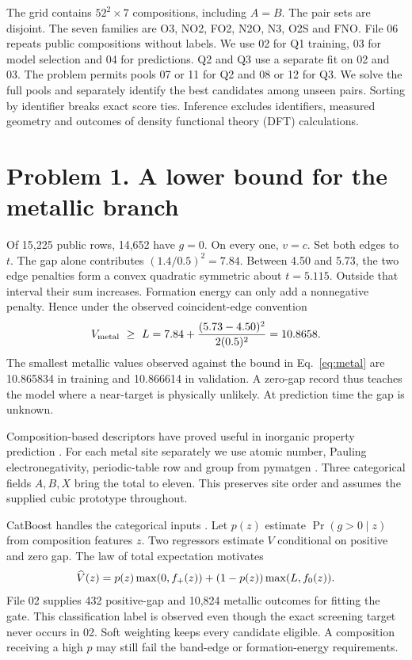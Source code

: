 The grid contains $52^2\times7$ compositions, including $A=B$. The pair sets are disjoint. The seven families are O3, NO2, FO2, N2O, N3, O2S and FNO. File 06 repeats public compositions without labels. We use 02 for Q1 training, 03 for model selection and 04 for predictions. Q2 and Q3 use a separate fit on 02 and 03. The problem permits pools 07 or 11 for Q2 and 08 or 12 for Q3. We solve the full pools and separately identify the best candidates among unseen pairs. Sorting by identifier breaks exact score ties. Inference excludes identifiers, measured geometry and outcomes of density functional theory (DFT) calculations.


\section{Problem 1. A lower bound for the metallic branch}
Of 15,225 public rows, 14,652 have $g=0$. On every one, $v=c$. Set both edges to $t$. The gap alone contributes $(1.4/0.5)^2=7.84$. Between 4.50 and 5.73, the two edge penalties form a convex quadratic symmetric about $t=5.115$. Outside that interval their sum increases. Formation energy can only add a nonnegative penalty. Hence under the observed coincident-edge convention
\begin{equation}
 V_{\rm metal}\ \geq\ L=7.84+
 \frac{(5.73-4.50)^2}{2(0.5)^2}=10.8658. \label{eq:metal}
\end{equation}
The smallest metallic values observed against the bound in Eq.~\eqref{eq:metal} are 10.865834 in training and 10.866614 in validation. A zero-gap record thus teaches the model where a near-target is physically unlikely. At prediction time the gap is unknown.



Composition-based descriptors have proved useful in inorganic property prediction \cite{ward}. For each metal site separately we use atomic number, Pauling electronegativity, periodic-table row and group from pymatgen \cite{ong}. Three categorical fields $A,B,X$ bring the total to eleven. This preserves site order and assumes the supplied cubic prototype throughout.

CatBoost handles the categorical inputs \cite{catboost}. Let $p(z)$ estimate $\Pr(g>0\mid z)$ from composition features $z$. Two regressors estimate $V$ conditional on positive and zero gap. The law of total expectation motivates
\begin{equation}
 \widehat V(z)=p(z)\max(0,f_+(z)) + (1-p(z))\max(L,f_0(z)).
 \label{eq:mix}
\end{equation}
File 02 supplies 432 positive-gap and 10,824 metallic outcomes for fitting the gate. This classification label is observed even though the exact screening target never occurs in 02. Soft weighting keeps every candidate eligible. A composition receiving a high $p$ may still fail the band-edge or formation-energy requirements.

